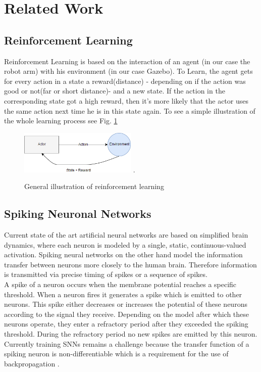 \section{Related Work}
\subsection{Reinforcement Learning}%
Reinforcement Learning is based on the interaction of an agent (in our case the robot arm) with his environment (in our case Gazebo). To Learn, the agent gets for every action in a state a reward(distance) - depending on if the action was good or not(far or short distance)- and a new state. If the action in the corresponding state got a high reward, then it's more likely that the actor uses the same action next time he is in this state again. To see a simple illustration of the whole learning process see Fig. \ref{re_base}
\begin{figure}[H]
	\centering
	\includegraphics[width=2.2in]{img/re_base.png}
	\DeclareGraphicsExtensions.
	\caption{General illustration of reinforcement learning}
	\label{re_base}
\end{figure}

\subsection{Spiking Neuronal Networks}
Current state of the art artificial neural networks are based on simplified brain dynamics, where each neuron is modeled by a single, static, continuous-valued activation. Spiking neural networks on the other hand model the information transfer between neurons more closely to the human brain. Therefore information is transmitted via precise timing of spikes or a sequence of spikes.\\
A spike of a neuron occurs when the membrane potential reaches a specific threshold. When a neuron fires it generates a spike which is emitted to other neurons. This spike either decreases or increases the potential of these neurons according to the signal they receive. Depending on the model after which these neurons operate, they enter a refractory period after they exceeded the spiking threshold. During the refractory period no new spikes are emitted by this neuron.\\
Currently training SNNs remains a challenge because the transfer function of a spiking neuron is non-differentiable which is a requirement for the use of backpropagation \cite{DBLP:journals/corr/abs-1804-08150}.


